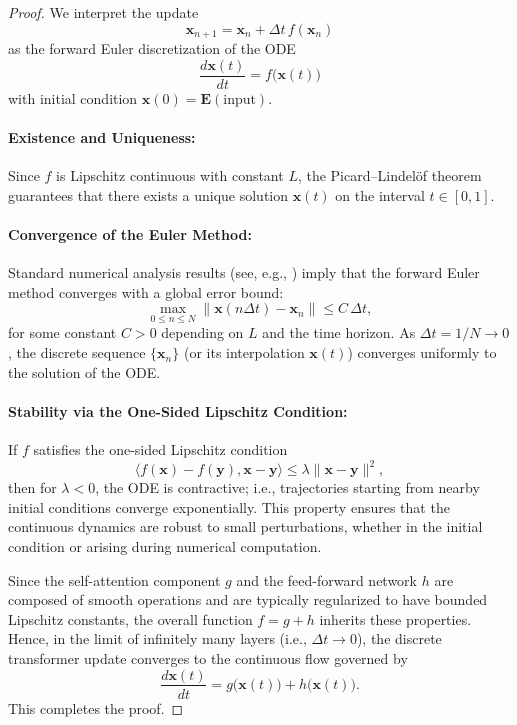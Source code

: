 \begin{proof}
We interpret the update
\[
\mathbf{x}_{n+1} = \mathbf{x}_n + \Delta t\, f(\mathbf{x}_n)
\]
as the forward Euler discretization of the ODE
\[
\frac{d\mathbf{x}(t)}{dt} = f\bigl(\mathbf{x}(t)\bigr)
\]
with initial condition $\mathbf{x}(0) = \mathbf{E}(\text{input})$.

\paragraph{Existence and Uniqueness:}  
Since $f$ is Lipschitz continuous with constant $L$, the Picard–Lindelöf theorem guarantees that there exists a unique solution $\mathbf{x}(t)$ on the interval $t \in [0,1]$.

\paragraph{Convergence of the Euler Method:}  
Standard numerical analysis results (see, e.g., \cite{HairerWanner}) imply that the forward Euler method converges with a global error bound:
\[
\max_{0 \le n \le N} \|\mathbf{x}(n\Delta t) - \mathbf{x}_n\| \le C\, \Delta t,
\]
for some constant $C>0$ depending on $L$ and the time horizon. As $\Delta t = 1/N \to 0$, the discrete sequence $\{\mathbf{x}_n\}$ (or its interpolation $\mathbf{x}(t)$) converges uniformly to the solution of the ODE.

\paragraph{Stability via the One-Sided Lipschitz Condition:}  
If $f$ satisfies the one-sided Lipschitz condition
\[
\langle f(\mathbf{x}) - f(\mathbf{y}), \mathbf{x} - \mathbf{y} \rangle \le \lambda \|\mathbf{x} - \mathbf{y}\|^2,
\]
then for $\lambda < 0$, the ODE is contractive; i.e., trajectories starting from nearby initial conditions converge exponentially. This property ensures that the continuous dynamics are robust to small perturbations, whether in the initial condition or arising during numerical computation.

Since the self-attention component $g$ and the feed-forward network $h$ are composed of smooth operations and are typically regularized to have bounded Lipschitz constants, the overall function $f = g + h$ inherits these properties. Hence, in the limit of infinitely many layers (i.e., $\Delta t \to 0$), the discrete transformer update converges to the continuous flow governed by
\[
\frac{d\mathbf{x}(t)}{dt} = g\bigl(\mathbf{x}(t)\bigr) + h\bigl(\mathbf{x}(t)\bigr).
\]
This completes the proof.
\end{proof}



